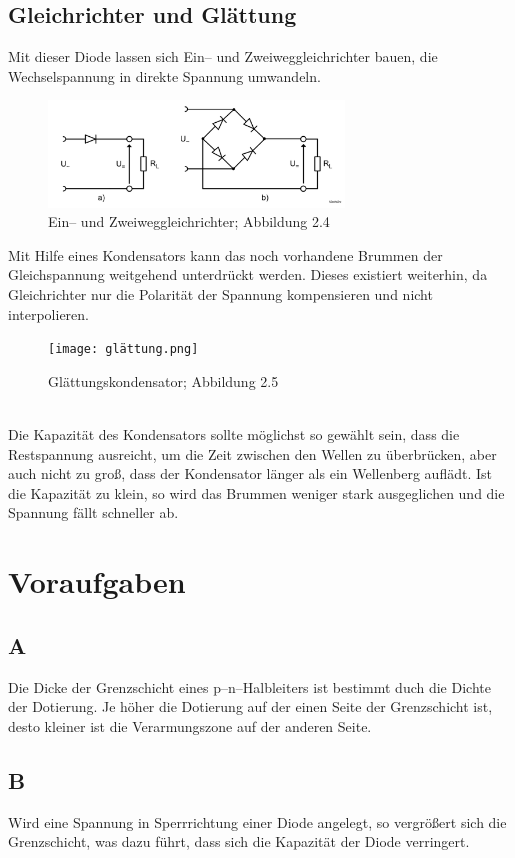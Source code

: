 \documentclass[a4paper,10pt]{article}
\numberwithin{equation}{section}
\begin{document}
\subsection{Gleichrichter und Glättung}
Mit dieser Diode lassen sich Ein-- und Zweiweggleichrichter bauen, die Wechselspannung in direkte Spannung umwandeln.
\begin{figure}[h]
        \centering
        \includegraphics[width=0.7\textwidth]{ein_zweiweggleichrichter.png}
        \caption{Ein-- und Zweiweggleichrichter; Abbildung 2.4 \cite{Praktikumsanleitung}}
\end{figure}
Mit Hilfe eines Kondensators kann das noch vorhandene Brummen der Gleichspannung weitgehend unterdrückt werden.
Dieses existiert weiterhin, da Gleichrichter nur die Polarität der Spannung kompensieren und nicht interpolieren.
\begin{figure}[h]
        \centering
        \texttt{[image: glättung.png]}
        \caption{Glättungskondensator; Abbildung 2.5 \cite{Praktikumsanleitung}}
\end{figure}\\
Die Kapazität des Kondensators sollte möglichst so gewählt sein, dass die Restspannung ausreicht, um die Zeit zwischen den Wellen zu überbrücken, aber auch nicht zu groß, dass der Kondensator länger als ein Wellenberg auflädt.
Ist die Kapazität zu klein, so wird das Brummen weniger stark ausgeglichen und die Spannung fällt schneller ab.

\clearpage
\section{Voraufgaben}
\subsection{A}
Die Dicke der Grenzschicht eines p--n--Halbleiters ist bestimmt duch die Dichte der Dotierung.
Je höher die Dotierung auf der einen Seite der Grenzschicht ist, desto kleiner ist die Verarmungszone auf der anderen Seite.

\subsection{B}
Wird eine Spannung in Sperrrichtung einer Diode angelegt, so vergrößert sich die Grenzschicht, was dazu führt, dass sich die Kapazität der Diode verringert.
\end{document}
